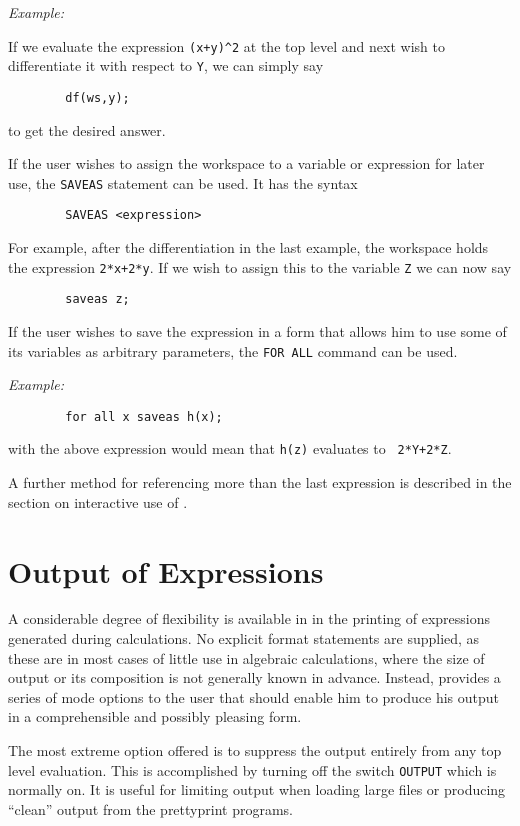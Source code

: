 {\it Example:}

If we evaluate the expression {\tt (x+y)\verb|^|2} at the top level and next
wish to differentiate it with respect to {\tt Y}, we can simply say
\begin{verbatim}
        df(ws,y);
\end{verbatim}
to get the desired answer.

If the user wishes to assign the workspace to a variable or expression for
later use, the {\tt SAVEAS} statement can be used.  It
has the syntax
\begin{verbatim}
        SAVEAS <expression>
\end{verbatim}
For example, after the differentiation in the last example, the workspace
holds the expression {\tt 2*x+2*y}.  If we wish to assign this to the
variable {\tt Z} we can now say
\begin{verbatim}
        saveas z;
\end{verbatim}
If the user wishes to save the expression in a form that allows him to use
some of its variables as arbitrary parameters, the {\tt FOR ALL}
command can be used.

{\it Example:}
\begin{verbatim}
        for all x saveas h(x);
\end{verbatim}

with the above expression would mean that {\tt h(z)} evaluates to {\tt
2*Y+2*Z}.

A further method for referencing more than the last expression is described
in the section on interactive use of {\REDUCE}.


\section{Output of Expressions}

A considerable degree of flexibility is available in {\REDUCE} in the
printing of expressions generated during calculations.  No explicit format
statements are supplied, as these are in most cases of little use in
algebraic calculations, where the size of output or its composition is not
generally known in advance.  Instead, {\REDUCE} provides a series of mode
options to the user that should enable him to produce his output in a
comprehensible and possibly pleasing form.

The most extreme option offered is to suppress the output entirely from
any top level evaluation.  This is accomplished by turning off the switch
{\tt OUTPUT} which is normally on.  It is useful for
limiting output when loading large files or producing ``clean'' output from
the prettyprint programs.

